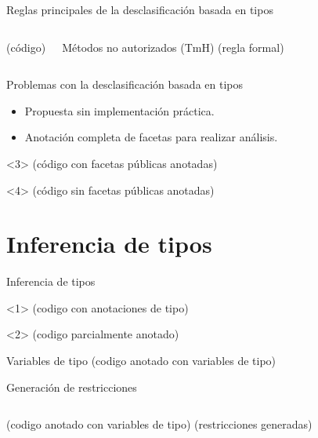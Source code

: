 \documentclass[aspectratio=169,10pt]{beamer}
\begin{document}
\begin{frame}[fragile]{Reglas principales de la desclasificación basada en tipos}
	\begin{columns}[T,onlytextwidth]
		(código)
		\begin{block}{Métodos no autorizados (TmH)}
			(regla formal)
		\end{block}
	\end{columns}
\end{frame}

\begin{frame}[fragile]{Problemas con la desclasificación basada en tipos}
	\begin{itemize}
		\item Propuesta sin implementación práctica. \pause
		\item Anotación completa de facetas para realizar análisis. \pause
	\end{itemize}

	\begin{onlyenv}
		(código con facetas públicas anotadas)
	\end{onlyenv}
	\begin{onlyenv}
		(código sin facetas públicas anotadas)
	\end{onlyenv}
\end{frame}

\section{Inferencia de tipos}

\begin{frame}[fragile]{Inferencia de tipos}
	\begin{onlyenv}
		(codigo con anotaciones de tipo)
	\end{onlyenv}
	\begin{onlyenv}
		(codigo parcialmente anotado)
	\end{onlyenv}
\end{frame}

\begin{frame}[fragile]{Variables de tipo}
	(codigo anotado con variables de tipo)
\end{frame}

\begin{frame}[fragile]{Generación de restricciones}
	\begin{columns}[T,onlytextwidth]
		(codigo anotado con variables de tipo)
		(restricciones generadas)
	\end{columns}
\end{frame}
\end{document}
